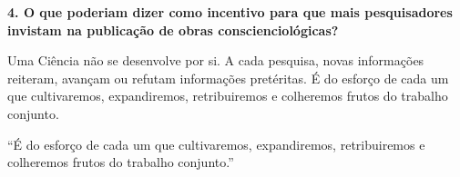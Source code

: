 \documentclass{gescons}
\begin{document}
\begin{multicols}{2}
\textbf{4. O que poderiam dizer como incentivo para que mais pesquisadores invistam na publicação de obras conscienciológicas?}

Uma Ciência não se desenvolve por si. A cada pesquisa, novas informações reiteram, avançam ou refutam informações pretéritas. É do esforço de cada um que cultivaremos, expandiremos, retribuiremos e colheremos frutos do trabalho conjunto.


\begin{pullquote}
``É do esforço de cada um que cultivaremos, expandiremos, retribuiremos e colheremos frutos do trabalho conjunto.''
\end{pullquote}

    
    \end{multicols}
\end{document}

